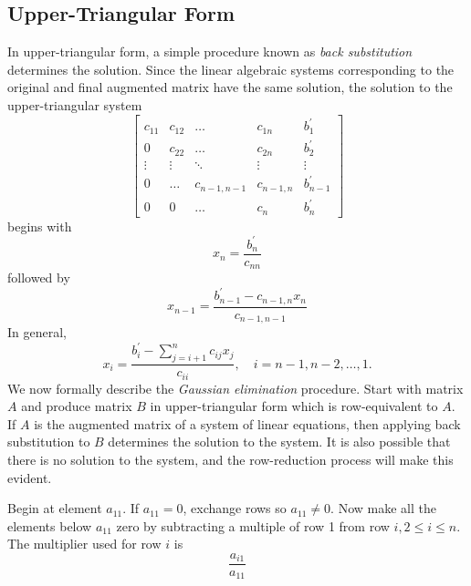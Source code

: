 \documentclass[../main.tex]{subfiles}
\begin{document}
\subsection{Upper-Triangular Form}
In upper-triangular form, a simple procedure known as \emph{back substitution} determines the solution. Since the linear algebraic systems corresponding to the original and final augmented matrix have the same solution, the solution to the upper-triangular system
$$
\left[\begin{array}{cccc|c}
c_{11} & c_{12} & \ldots & c_{1 n} & b_{1}^{\prime} \\
0 & c_{22} & \ldots & c_{2 n} & b_{2}^{\prime} \\
\vdots & \vdots & \ddots & \vdots & \vdots \\
0 & \ldots & c_{n-1, n-1} & c_{n-1, n} & b_{n-1}^{\prime} \\
0 & 0 & \ldots & c_{n} & b_{n}^{\prime}
\end{array}\right]
$$
begins with
$$
x_{n}=\frac{b_{n}^{\prime}}{c_{n n}}
$$
followed by
$$
x_{n-1}=\frac{b_{n-1}^{\prime}-c_{n-1, n} x_{n}}{c_{n-1, n-1}}
$$
In general,
$$
x_{i}=\frac{b_{i}^{\prime}-\sum_{j=i+1}^{n} c_{i j} x_{j}}{c_{i i}}, \quad i=n-1, n-2, \ldots, 1 .
$$
We now formally describe the \emph{Gaussian elimination} procedure. Start with matrix $A$ and produce matrix $B$ in upper-triangular form which is row-equivalent to $A .$ If $A$ is the augmented matrix of a system of linear equations, then applying back substitution to $B$ determines the solution to the system. It is also possible that there is no solution to the system, and the row-reduction process will make this evident.

Begin at element $a_{11}$. If $a_{11}=0$, exchange rows so $a_{11} \neq 0 .$ Now make all the elements below $a_{11}$ zero by subtracting a multiple of row 1 from row $i, 2 \leq i \leq n$. The multiplier used for row $i$ is
$$\frac{a_{i 1}}{a_{1 1}}$$
\end{document}
